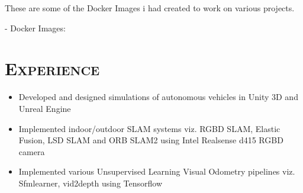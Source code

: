 \documentclass[11pt,a4paper,roman]{moderncv} %
\begin{document}
These are some of the Docker Images i had created to work on various projects.

- Docker Images:  





\makeletterclosing %

\newpage


\makecvtitle %


\section{\scshape{Experience}}

{
\begin{itemize}
\item Developed and designed simulations of autonomous vehicles in Unity 3D and Unreal
    Engine
\item Implemented indoor/outdoor SLAM systems viz. RGBD SLAM, Elastic Fusion, 
LSD SLAM and ORB SLAM2 using Intel Realsense d415 RGBD camera    
\item Implemented various Unsupervised Learning Visual Odometry pipelines viz. Sfmlearner, vid2depth using Tensorflow
\newline{}
\end{itemize}}

\end{document}
